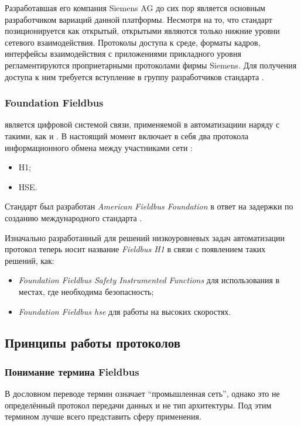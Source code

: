 Разработавшая его компания Siemens AG до сих пор является основным разработчиком вариаций данной платформы. Несмотря на то, что стандарт позиционируется как открытый, открытыми являются только нижние уровни сетевого взаимодействия. Протоколы доступа к среде, форматы кадров, интерфейсы взаимодействия с приложени­ями прикладного уровня регламентируются проприетарными прото­колами фирмы Siemens. Для получения доступа к ним требуется всту­пление в группу разработчиков стандарта \pb \cite{__2001}.

\subsubsection{Foundation Fieldbus}
\ffb является цифровой системой связи, применяемой в автоматизациии наряду с такими, как \pb и \mb. В настоящий момент включает в себя два протокола информационного обмена между участниками сети \cite{phoenix_contact__2020}: 
\begin{itemize}
	\item H1;
	\item HSE.
\end{itemize}

Стандарт был разработан \textit{American Fieldbus Foundation} в ответ на задержки по созданию международного стандарта \fb \cite{galloway_introduction_2012}. 

Изначально разработанный для решений низкоуровневых задач автоматизации протокол \fb теперь носит название \textit{Fieldbus H1} в связи с появлением таких решений, как:
\begin{itemize}
	\item \textit{Foundation Fieldbus Safety Instrumented Functions} для использования в местах, где необходима безопасность;
	\item\textit{Foundation Fieldbus \Gls{hse}} для работы на высоких скоростях.
\end{itemize}
\subsection{Принципы работы протоколов}
\subsubsection{Понимание термина Fieldbus}\label{par:fieldbus}
В дословном переводе термин \fb означает ``промышленная сеть'', однако это не определённый протокол передачи данных и не тип архитектуры. Под этим термином лучше всего представить сферу применения. 

